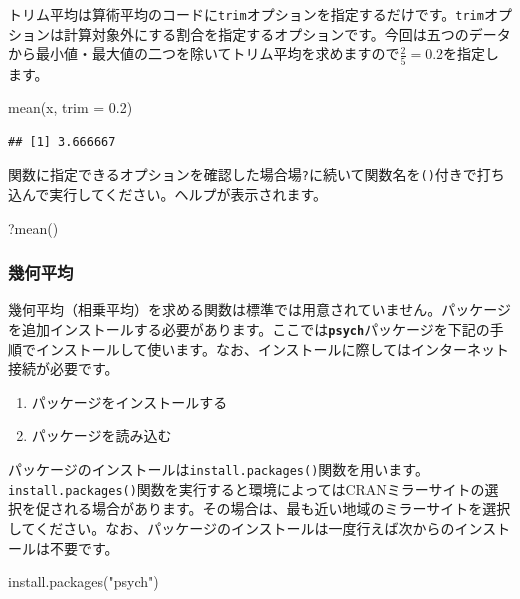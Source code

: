 \documentclass[
  12pt,
]{book}
\newenvironment{Shaded}{\begin{snugshade}}{\end{snugshade}}
\newcommand{\AttributeTok}[1]{\textcolor[rgb]{0.77,0.63,0.00}{#1}}
\newcommand{\FloatTok}[1]{\textcolor[rgb]{0.00,0.00,0.81}{#1}}
\newcommand{\FunctionTok}[1]{\textcolor[rgb]{0.00,0.00,0.00}{#1}}
\newcommand{\NormalTok}[1]{#1}
\newcommand{\StringTok}[1]{\textcolor[rgb]{0.31,0.60,0.02}{#1}}
\providecommand{\tightlist}{%
  \setlength{\itemsep}{0pt}\setlength{\parskip}{0pt}}
\begin{document}
トリム平均は算術平均のコードに\texttt{trim}オプションを指定するだけです。\texttt{trim}オプションは計算対象外にする割合を指定するオプションです。今回は五つのデータから最小値・最大値の二つを除いてトリム平均を求めますので\(\frac{2}{5} = 0.2\)を指定します。

\begin{Shaded}
\begin{Highlighting}[]
\FunctionTok{mean}\NormalTok{(x, }\AttributeTok{trim =} \FloatTok{0.2}\NormalTok{)}
\end{Highlighting}
\end{Shaded}

\begin{verbatim}
## [1] 3.666667
\end{verbatim}

関数に指定できるオプションを確認した場合場\texttt{?}に続いて関数名を\texttt{()}付きで打ち込んで実行してください。ヘルプが表示されます。

\begin{Shaded}
\begin{Highlighting}[]
\NormalTok{?}\FunctionTok{mean}\NormalTok{()}
\end{Highlighting}
\end{Shaded}

\hypertarget{ux5e7eux4f55ux5e73ux5747}{%
\subsubsection{幾何平均}\label{ux5e7eux4f55ux5e73ux5747}}

幾何平均（相乗平均）を求める関数は標準では用意されていません。パッケージを追加インストールする必要があります。ここでは\textbf{\texttt{psych}}パッケージを下記の手順でインストールして使います。なお、インストールに際してはインターネット接続が必要です。

\begin{enumerate}
\def\labelenumi{\arabic{enumi}.}
\tightlist
\item
  パッケージをインストールする
\item
  パッケージを読み込む
\end{enumerate}

パッケージのインストールは\texttt{install.packages()}関数を用います。\texttt{install.packages()}関数を実行すると環境によってはCRANミラーサイトの選択を促される場合があります。その場合は、最も近い地域のミラーサイトを選択してください。なお、パッケージのインストールは一度行えば次からのインストールは不要です。

\begin{Shaded}
\begin{Highlighting}[]
\FunctionTok{install.packages}\NormalTok{(}\StringTok{"psych"}\NormalTok{)}
\end{Highlighting}
\end{Shaded}
\end{document}
